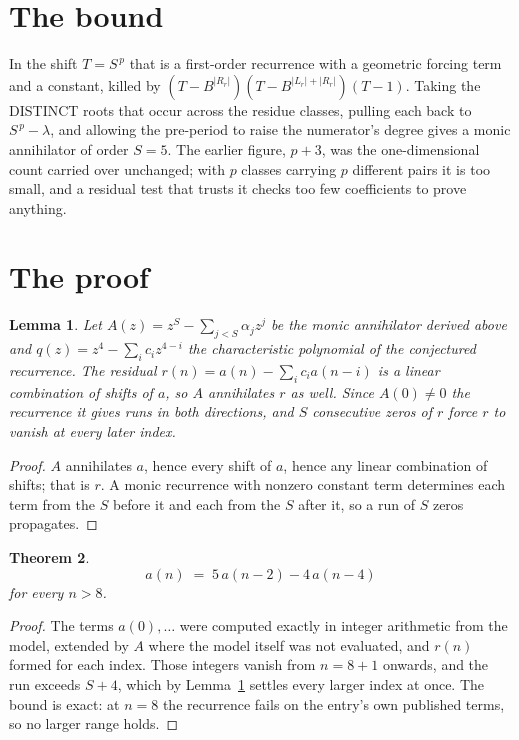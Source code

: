 \documentclass[11pt,a4paper]{article}
\theoremstyle{plain}
\newtheorem{theorem}{Theorem}
\newtheorem{lemma}[theorem]{Lemma}
\theoremstyle{definition}
\begin{document}
\section{The bound}

In the shift $T=S^{\,p}$ that is a first-order recurrence with a geometric forcing term and a
constant, killed by $(T-B^{|R_r|})(T-B^{|L_r|+|R_r|})(T-1)$. Taking the DISTINCT roots that
occur across the residue classes, pulling each back to $S^{\,p}-\lambda$, and allowing the
pre-period to raise the numerator's degree gives a monic annihilator of order $S=5$. The
earlier figure, $p+3$, was the one-dimensional count carried over unchanged; with $p$ classes
carrying $p$ different pairs it is too small, and a residual test that trusts it checks too few
coefficients to prove anything.

\section{The proof}

\begin{lemma}\label{lem:crit}
Let $A(z)=z^S-\sum_{j<S}\alpha_jz^{j}$ be the monic annihilator derived above and
$q(z)=z^{4}-\sum_ic_iz^{4-i}$ the characteristic polynomial of the conjectured
recurrence. The residual $r(n)=a(n)-\sum_ic_ia(n-i)$ is a linear combination of shifts of $a$,
so $A$ annihilates $r$ as well. Since $A(0)\ne0$ the recurrence it gives runs in both
directions, and $S$ consecutive zeros of $r$ force $r$ to vanish at every later index.
\end{lemma}

\begin{proof}
$A$ annihilates $a$, hence every shift of $a$, hence any linear combination of shifts; that is
$r$. A monic recurrence with nonzero constant term determines each term from the $S$ before it
and each from the $S$ after it, so a run of $S$ zeros propagates.
\end{proof}

\begin{theorem}
\[
a(n)\;=\;5\,a(n-2) - 4\,a(n-4)
\]
for every $n>8$.
\end{theorem}

\begin{proof}
The terms $a(0),\dots$ were computed exactly in integer arithmetic from the model, extended by
$A$ where the model itself was not evaluated, and $r(n)$ formed for each index. Those integers
vanish from $n=8+1$ onwards, and the run exceeds $S+4$, which by
Lemma~\ref{lem:crit} settles every larger index at once. The bound is exact: at $n=8$ the recurrence fails on the entry's own published terms, so no larger range holds.
\end{proof}
\end{document}
